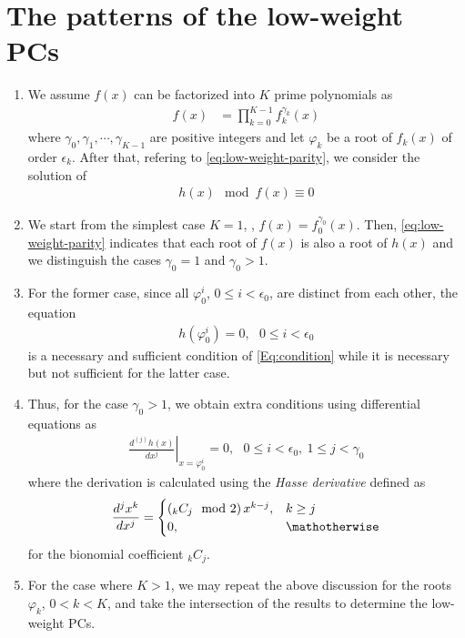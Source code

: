 \section{The patterns of the low-weight PCs}
\label{sec3}
\begin{enumerate}
\item We assume $f(x)$ can be factorized into $K$ prime polynomials as 
\begin{align}
f(x)&=\prod_{k=0}^{K-1}f_k^{\gamma_k}(x)
\label{Eq:GeneralForm}
\end{align}
where $\gamma_0,\gamma_1,\cdots,\gamma_{K-1}$ are positive integers and let $\varphi_k$ be a root of $f_{k}(x)$ of order $\epsilon_k$. After that, refering to \eqref{eq:low-weight-parity}, we consider the solution of
\begin{align}
	h(x) \mod f(x) \equiv 0
	\label{Eq:condition}
\end{align}

\item We start from the simplest case $K=1$, \ie, $f(x) = f_0^{\gamma_0}(x)$. Then, \eqref{eq:low-weight-parity} indicates that each root of $f(x)$ is also a root of $h(x)$ and we distinguish the cases $\gamma_0 = 1$ and $\gamma_0 > 1$. 

\item For the former case, since all $\varphi_0^i$, $0 \leq i < \epsilon_0$, are distinct from each other, the equation
\begin{align}
	h(\varphi_0^i)=0,~~~ 0 \leq i < \epsilon_0
	\label{Eq:rootcondition}
\end{align}
is a necessary and sufficient condition of \eqref{Eq:condition} while it is necessary but not sufficient for the latter case. 

\item Thus, for the case $\gamma_0 >1$, we obtain extra conditions using differential equations as
\begin{align}
\left.\frac{d^{(j)}h(x)}{d x^j}\right|_{x=\varphi_0^i}=0,~~~0 \leq i < \epsilon_0,~1 \leq j < \gamma_0
\label{Eq:differential}
\end{align}
where the derivation is calculated using the {\it Hasse derivative} defined as
\begin{align}
\frac{d^{j}x^k}{dx^j}=
	\begin{cases}
	\left({}_kC_j\mod 2\right)x^{k-j}, & k \geq j\cr
	0, & \mathotherwise
	\end{cases}
\end{align}
for the bionomial coefficient ${}_kC_j$.

\item For the case where $K>1$, we may repeat the above discussion for the roots $\varphi_k$, $0 < k < K$, and take the intersection of the results to determine the low-weight PCs.
\end{enumerate}

